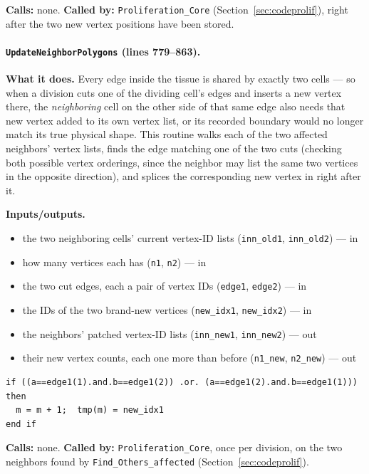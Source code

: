\documentclass[11pt]{article}
\begin{document}
\textbf{Calls:} none. \textbf{Called by:} \texttt{Proliferation\_Core}
(Section~\ref{sec:codeprolif}), right after the two new vertex positions have been
stored.

\paragraph{\texttt{UpdateNeighborPolygons} (lines 779--863).}
\textbf{What it does.} Every edge inside the tissue is shared by exactly two cells ---
so when a division cuts one of the dividing cell's edges and inserts a new vertex
there, the \emph{neighboring} cell on the other side of that same edge also needs that
new vertex added to its own vertex list, or its recorded boundary would no longer match
its true physical shape. This routine walks each of the two affected neighbors' vertex
lists, finds the edge matching one of the two cuts (checking both possible vertex
orderings, since the neighbor may list the same two vertices in the opposite direction),
and splices the corresponding new vertex in right after it.

\textbf{Inputs/outputs.}
\begin{itemize}[nosep]
  \item the two neighboring cells' current vertex-ID lists (\texttt{inn\_old1}, \texttt{inn\_old2}) --- in
  \item how many vertices each has (\texttt{n1}, \texttt{n2}) --- in
  \item the two cut edges, each a pair of vertex IDs (\texttt{edge1}, \texttt{edge2}) --- in
  \item the IDs of the two brand-new vertices (\texttt{new\_idx1}, \texttt{new\_idx2}) --- in
  \item the neighbors' patched vertex-ID lists (\texttt{inn\_new1}, \texttt{inn\_new2}) --- out
  \item their new vertex counts, each one more than before (\texttt{n1\_new}, \texttt{n2\_new}) --- out
\end{itemize}

\begin{lstlisting}[caption={Splicing a new vertex into a neighbor's list wherever its edge matches one of the two cuts (either vertex order).}]
if ((a==edge1(1).and.b==edge1(2)) .or. (a==edge1(2).and.b==edge1(1))) then
  m = m + 1;  tmp(m) = new_idx1
end if
\end{lstlisting}

\textbf{Calls:} none. \textbf{Called by:} \texttt{Proliferation\_Core}, once per
division, on the two neighbors found by \texttt{Find\_Others\_affected}
(Section~\ref{sec:codeprolif}).
\end{document}
